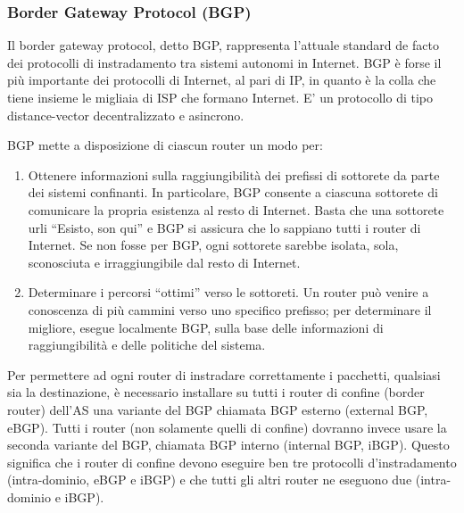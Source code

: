 \subsubsection{Border Gateway Protocol (BGP)}
Il border gateway protocol, detto BGP, rappresenta l’attuale standard de facto dei protocolli di instradamento tra sistemi autonomi in Internet. BGP è forse il più importante dei protocolli di Internet, al pari di IP, in quanto è la colla che tiene insieme le migliaia di ISP che formano Internet. E' un protocollo di tipo distance-vector decentralizzato e asincrono.

BGP mette a disposizione di ciascun router un modo per:
\begin{enumerate}
    \item Ottenere informazioni sulla raggiungibilità dei prefissi di sottorete da parte dei sistemi confinanti. In particolare, BGP consente a ciascuna sottorete di comunicare la propria esistenza al resto di Internet. Basta che una sottorete urli “Esisto, son qui” e BGP si assicura che lo sappiano tutti i router di Internet. Se non fosse per BGP, ogni sottorete sarebbe isolata, sola, sconosciuta e irraggiungibile dal resto di Internet.
    \item Determinare i percorsi “ottimi” verso le sottoreti. Un router può venire a conoscenza di più cammini verso uno specifico prefisso; per determinare il migliore, esegue localmente BGP, sulla base delle informazioni di raggiungibilità e delle politiche del sistema.
\end{enumerate}

Per permettere ad ogni router di instradare correttamente i pacchetti, qualsiasi sia la destinazione, è necessario installare su tutti i router di confine (border router) dell'AS una variante del BGP chiamata BGP esterno (external BGP, eBGP). Tutti i router (non solamente quelli di confine) dovranno invece usare la seconda variante del BGP, chiamata BGP interno (internal BGP, iBGP). Questo significa che i router di confine devono eseguire ben tre protocolli d'instradamento (intra-dominio, eBGP e iBGP) e che tutti gli altri router ne eseguono due (intra-dominio e iBGP).




